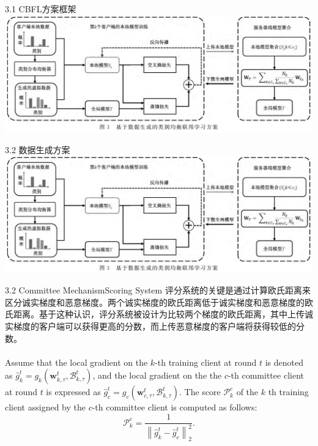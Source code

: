 \documentclass{sintefbeamer}
\theoremstyle{definition}
\begin{document}
\begin{frame}{3.1 CBFL方案框架}
\centering
\includegraphics[width=1\textwidth]{images/img_overview}

\end{frame}

\begin{frame}{3.2 数据生成方案}
\centering
\includegraphics[width=1\textwidth]{images/img_overview}

\end{frame}

\begin{frame}{3.2 Committee Mechanism}{Scoring System}
评分系统的关键是通过计算欧氏距离来区分诚实梯度和恶意梯度。两个诚实梯度的欧氏距离低于诚实梯度和恶意梯度的欧氏距离。基于这种认识，评分系统被设计为比较两个梯度的欧氏距离，其中上传诚实梯度的客户端可以获得更高的分数，而上传恶意梯度的客户端将获得较低的分数。
\\ \hspace*{\fill} \\
Assume that the local gradient on the $k$-th training client at round $t$ is denoted as $\hat{g}_k^t=g_k\left(\mathbf{w}_{k, \tau}^t, \mathcal{B}_{k, \tau}^t\right)$, and the local gradient on the the $c$-th committee client at round $t$ is expressed as $\hat{g}_c^t=g_c\left(\mathbf{w}_{c, \tau}^t, \mathcal{B}_{k, \tau}^t\right)$. The score $\mathcal{P}_k^c$ of the $k$ th training client assigned by the $c$-th committee client is computed as follows:
$$
\mathcal{P}_k^c=\frac{1}{\left\|\hat{g}_k^t-\hat{g}_c^t\right\|_2^2} .
$$
\end{frame}
\end{document}

